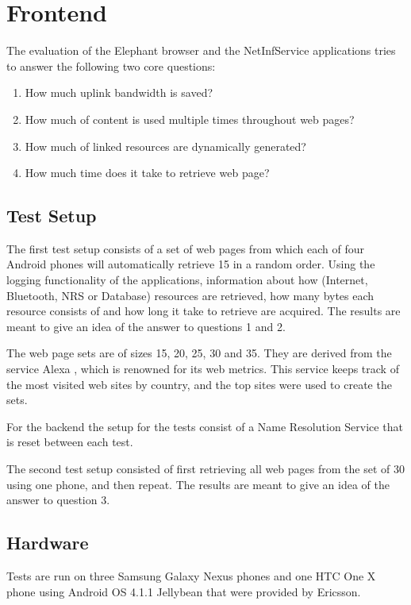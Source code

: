 \section{Frontend}
The evaluation of the Elephant browser and the NetInfService applications tries to answer the following two core questions:

\begin{enumerate}
\item How much uplink bandwidth is saved?
\item How much of content is used multiple times throughout web pages?
\item How much of linked resources are dynamically generated?
\item How much time does it take to retrieve web page?
\end{enumerate}

\subsection{Test Setup}

The first test setup consists of a set of web pages from which each of four Android phones will automatically retrieve 15 in a random order. Using the logging functionality of the applications, information about how (Internet, Bluetooth, NRS or Database) resources are retrieved, how many bytes each resource consists of and how long it take to retrieve are acquired. The results are meant to give an idea of the answer to questions 1 and 2.

The web page sets are of sizes 15, 20, 25, 30 and 35. They are derived from the service Alexa \cite{alexa}, which is renowned for its web metrics. This service keeps track of the most visited web sites by country, and the top sites were used to create the sets.

For the backend the setup for the tests consist of a Name Resolution Service that is reset between each test.

The second test setup consisted of first retrieving all web pages from the set of 30 using one phone, and then repeat. The results are meant to give an idea of the answer to question 3.

\subsection{Hardware}

Tests are run on three Samsung Galaxy Nexus phones and one HTC One X phone using Android OS 4.1.1 Jellybean that were provided by Ericsson.

